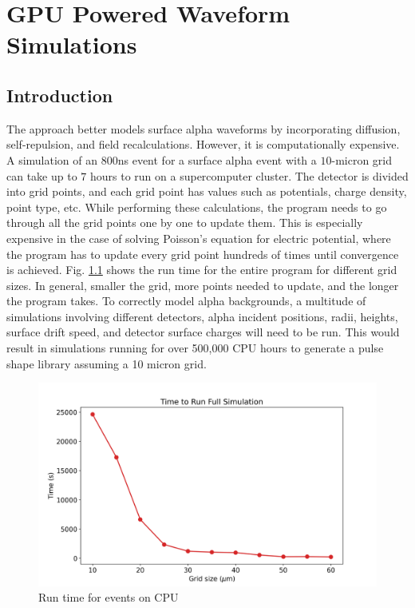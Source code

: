 \chapter{GPU Powered Waveform Simulations}
\label{chap4:gpu}
\section{Introduction}
 


The {\tdsim} approach better models surface alpha waveforms by incorporating diffusion, self-repulsion, and field recalculations. However, it is computationally expensive. A simulation of an $800$ns event for a surface alpha event with a $10$-micron grid can take up to $7$ hours to run on a supercomputer cluster. The detector is divided into grid points, and each grid point has values such as potentials, charge density, point type, etc. While performing these calculations, the program needs to go through all the grid points one by one to update them. This is especially expensive in the case of solving Poisson's equation for electric potential, where the program has to update every grid point hundreds of times until convergence is achieved. Fig. \ref{fig:CPU_time} shows the run time for the entire program for different grid sizes. In general, smaller the grid, more points needed to update, and the longer the program takes. To correctly model alpha backgrounds, a multitude of simulations involving different detectors, alpha incident positions, radii, heights, surface drift speed, and detector surface charges will need to be run. This would result in simulations running for over 500,000 CPU hours to generate a pulse shape library assuming a 10 micron grid.





\begin{figure}
\centering
 \includegraphics[width=0.99\linewidth]{ch4/figs/cpu_run_time.png}
\caption{Run time for events on CPU}
\label{fig:CPU_time}
\end{figure}


